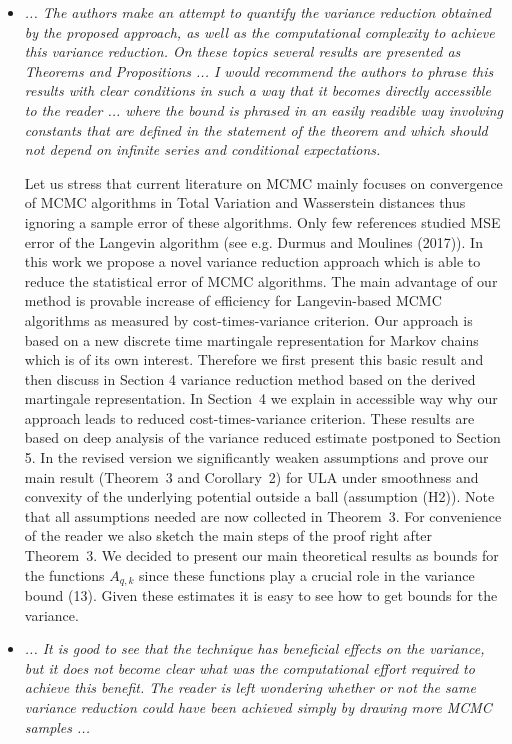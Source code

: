 \documentclass{article}%
\begin{document}
\begin{itemize}

\item \textit{... The authors make an attempt to quantify the variance reduction obtained by the proposed approach, as well as the computational complexity to achieve this variance reduction. On these topics several results are presented as Theorems and Propositions  ... I would recommend the authors to phrase this results with clear conditions in such a way that it becomes directly accessible to the reader ... where the bound is phrased in an easily readible way involving constants that are defined in the statement of the theorem and which should not depend on infinite series and conditional expectations.}
\par
Let us stress that  current literature on MCMC  mainly focuses on  convergence of MCMC algorithms in Total Variation and Wasserstein distances thus  ignoring a sample error of these algorithms. Only few references studied MSE error of the Langevin algorithm (see e.g.  Durmus and  Moulines (2017)). In this work we propose a novel variance reduction approach which is able to reduce the statistical error of MCMC algorithms. The main advantage of our method is provable increase of efficiency for Langevin-based MCMC algorithms as measured by  cost-times-variance criterion. Our approach is based on a new discrete time martingale representation for Markov chains which is of its own interest. Therefore we first present this basic result and then discuss in Section 4 variance reduction method based on the derived martingale representation. In  Section~4 we  explain in accessible way why our approach leads to reduced cost-times-variance criterion. These results are based on deep analysis of the variance reduced estimate postponed to Section 5. In the revised version we significantly weaken  assumptions and prove our main result (Theorem~3 and Corollary~2) for ULA under smoothness  and convexity of the underlying potential outside a ball (assumption  (H2)).   Note that all assumptions needed are now collected in Theorem~3. For convenience of the reader we also sketch the main steps of the proof right after 
Theorem~3. We decided to present our main theoretical results as bounds for the functions $A_{q,k}$ since these functions play a crucial role in the variance bound (13). Given these estimates it is easy to see how to get bounds for the variance. 
\item \textit{... It is good to see that the technique has beneficial effects on the variance, but it does not become clear what was the computational effort required to achieve this benefit. The reader is left wondering whether or not the same variance reduction could have been achieved simply by drawing more MCMC samples ...}

\end{itemize}
\end{document}
